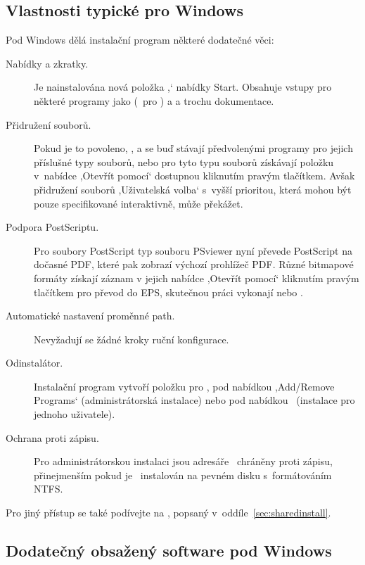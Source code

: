 \documentclass[\classoptions,slovak,english,czech]{\classname}
\newcommand{\singleuv}[1]{,#1`}
\begin{document}
\subsection{Vlastnosti typické pro Windows}  %
\label{sec:winfeatures}
Pod Windows dělá instalační program některé dodatečné věci:
\begin{description}
\item[Nabídky a zkratky.] Je nainstalována nová položka \singleuv{\TL{}} nabídky
  Start. Obsahuje vstupy pro některé programy \GUI{} jako 
  (\GUI\  pro ) a  a trochu dokumentace. 
  
%
\item[Přidružení souborů.] Pokud je to povoleno, , 
  a  se buď stávají předvolenými programy pro jejich příslušné
  typy souborů, nebo pro tyto typu souborů získávají položku v~nabídce 
  \singleuv{Otevřít pomocí} dostupnou kliknutím pravým tlačítkem.
  Avšak přidružení souborů \singleuv{Uživatelská volba} s~vyšší prioritou, která mohou být pouze
  specifikované interaktivně, může překážet. 
%
\item[Podpora PostScriptu.] Pro soubory PostScript typ souboru PSviewer
nyní převede PostScript na dočasné PDF, které pak
zobrazí výchozí prohlížeč PDF. Různé bitmapové formáty získají
záznam  v jejich nabídce \singleuv{Otevřít pomocí} kliknutím pravým tlačítkem
pro převod do EPS, skutečnou práci vykonají  nebo . 

\item[Automatické nastavení proměnné path.] Nevyžadují se žádné
   kroky ruční konfigurace.
%
 \item[Odinstalátor.] Instalační program vytvoří položku 
  pro \TL{}, pod nabídkou \singleuv{Add/Remove Programs} (administrátorská instalace) nebo pod nabídkou \TL\ (instalace pro jednoho uživatele).

%
\item[Ochrana proti zápisu.] Pro administrátorskou instalaci jsou adresáře 
  \TL\ chráněny proti zápisu, přinejmenším pokud je \TL\ instalován na pevném disku
  s~formátováním NTFS.
\end{description}


Pro jiný přístup se také podívejte na , 
popsaný v~oddíle~\ref{sec:sharedinstall}.


\subsection{Dodatečný obsažený software pod Windows}
\end{document}
